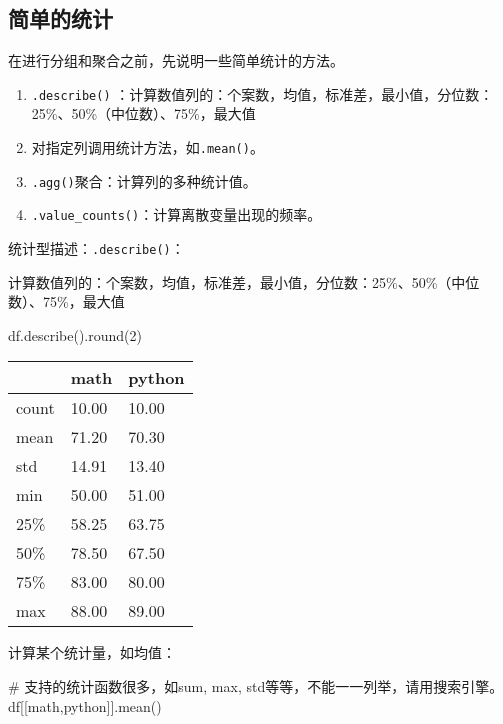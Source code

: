 \documentclass[
  letterpaper,
  DIV=11,
  numbers=noendperiod]{scrreprt}
\newenvironment{Shaded}{\begin{snugshade}}{\end{snugshade}}
\newcommand{\BuiltInTok}[1]{\textcolor[rgb]{0.00,0.23,0.31}{#1}}
\newcommand{\CommentTok}[1]{\textcolor[rgb]{0.37,0.37,0.37}{#1}}
\newcommand{\DecValTok}[1]{\textcolor[rgb]{0.68,0.00,0.00}{#1}}
\newcommand{\NormalTok}[1]{\textcolor[rgb]{0.00,0.23,0.31}{#1}}
\newcommand{\StringTok}[1]{\textcolor[rgb]{0.13,0.47,0.30}{#1}}
\providecommand{\tightlist}{%
  \setlength{\itemsep}{0pt}\setlength{\parskip}{0pt}}\usepackage{longtable,booktabs,array}
\begin{document}
\hypertarget{ux7b80ux5355ux7684ux7edfux8ba1}{%
\subsection{简单的统计}\label{ux7b80ux5355ux7684ux7edfux8ba1}}

在进行分组和聚合之前，先说明一些简单统计的方法。

\begin{enumerate}
\def\labelenumi{\arabic{enumi}.}
\tightlist
\item
  \texttt{.describe()}
  ：计算数值列的：个案数，均值，标准差，最小值，分位数：25\%、50\%（中位数）、75\%，最大值
\item
  对指定列调用统计方法，如\texttt{.mean()}。
\item
  \texttt{.agg()}聚合：计算列的多种统计值。
\item
  \texttt{.value\_counts()}：计算离散变量出现的频率。
\end{enumerate}

统计型描述：\texttt{.describe()}：

计算数值列的：个案数，均值，标准差，最小值，分位数：25\%、50\%（中位数）、75\%，最大值

\begin{Shaded}
\begin{Highlighting}[]
\NormalTok{df.describe().}\BuiltInTok{round}\NormalTok{(}\DecValTok{2}\NormalTok{)}
\end{Highlighting}
\end{Shaded}

\begin{longtable}[]{@{}lll@{}}
\toprule\noalign{}
& math & python \\
\midrule\noalign{}
\endhead
\bottomrule\noalign{}
\endlastfoot
count & 10.00 & 10.00 \\
mean & 71.20 & 70.30 \\
std & 14.91 & 13.40 \\
min & 50.00 & 51.00 \\
25\% & 58.25 & 63.75 \\
50\% & 78.50 & 67.50 \\
75\% & 83.00 & 80.00 \\
max & 88.00 & 89.00 \\
\end{longtable}

计算某个统计量，如均值：

\begin{Shaded}
\begin{Highlighting}[]
\CommentTok{\# 支持的统计函数很多，如sum, max, std等等，不能一一列举，请用搜索引擎。}
\NormalTok{df[[}\StringTok{\textquotesingle{}math\textquotesingle{}}\NormalTok{,}\StringTok{\textquotesingle{}python\textquotesingle{}}\NormalTok{]].mean()}
\end{Highlighting}
\end{Shaded}
\end{document}
